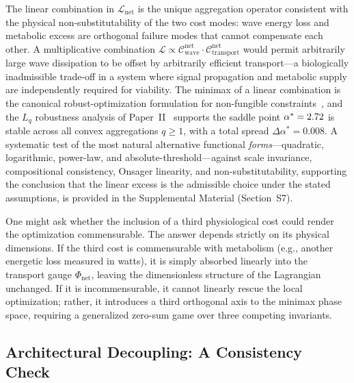 \begin{remark}
The linear combination in $\mathcal{L}_{\mathrm{net}}$ is the unique aggregation
operator consistent with the physical non-substitutability of the two cost
modes: wave energy loss and metabolic excess are orthogonal failure modes that
cannot compensate each other. A multiplicative combination $\mathcal{L} \propto
\mathcal{C}_{\mathrm{wave}}^{\mathrm{net}} \cdot
\mathcal{C}_{\mathrm{transport}}^{\mathrm{net}}$ would permit arbitrarily large
wave dissipation to be offset by arbitrarily efficient transport---a
biologically inadmissible trade-off in a system where signal propagation and
metabolic supply are independently required for viability. The minimax of a
linear combination is the canonical robust-optimization formulation for
non-fungible constraints~\cite{ben-tal2009}, and the $L_q$ robustness analysis
of Paper~II~\cite{paperII} supports the saddle point $\alpha^* =
2.72$ is stable across all convex aggregations $q \geq 1$, with a total
spread $\Delta\alpha^* = 0.008$. A systematic test of the most natural
alternative functional \emph{forms}---quadratic, logarithmic, power-law, and
absolute-threshold---against scale invariance, compositional consistency,
Onsager linearity, and non-substitutability, supporting the conclusion
that the linear excess is the admissible choice under the stated
assumptions, is provided in the Supplemental Material (Section~S7).
\end{remark}

\begin{remark}
One might ask whether the inclusion of a third physiological cost could render
the optimization commensurable. The answer depends strictly on its physical
dimensions. If the third cost is commensurable with metabolism (e.g., another
energetic loss measured in watts), it is simply absorbed linearly into the
transport gauge $\Phi_{\mathrm{net}}$, leaving the dimensionless structure of
the Lagrangian unchanged. If it is incommensurable, it cannot linearly rescue
the local optimization; rather, it introduces a third orthogonal axis to the
minimax phase space, requiring a generalized zero-sum game over three competing
invariants.
\end{remark}

\subsection{Architectural Decoupling: A Consistency Check}

